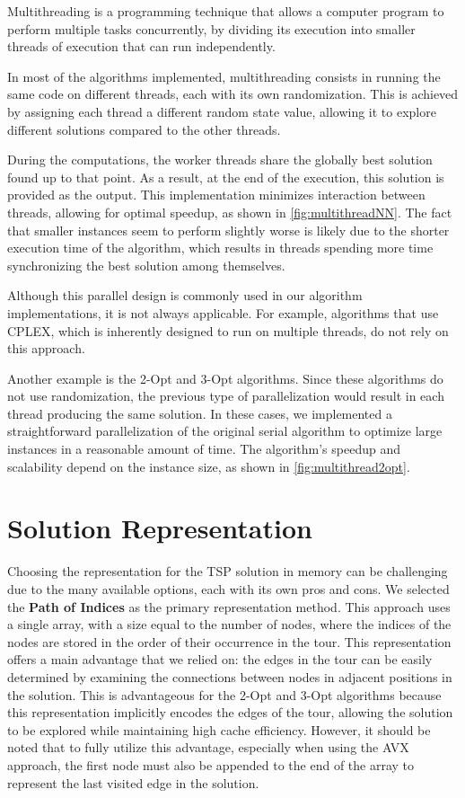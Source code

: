Multithreading is a programming technique that allows a computer program to perform multiple tasks concurrently, by dividing its execution into smaller threads of execution that can run independently.

In most of the algorithms implemented, multithreading consists in running the same code on different threads, each with its own randomization.
This is achieved by assigning each thread a different random state value, allowing it to explore different solutions compared to the other threads.

During the computations, the worker threads share the globally best solution found up to that point.
As a result, at the end of the execution, this solution is provided as the output.
This implementation minimizes interaction between threads, allowing for optimal speedup, as shown in \figurename{ \ref{fig:multithreadNN}}.
The fact that smaller instances seem to perform slightly worse is likely due to the shorter execution time of the algorithm, which results in threads spending more time synchronizing the best solution among themselves.

Although this parallel design is commonly used in our algorithm implementations, it is not always applicable.
For example, algorithms that use CPLEX, which is inherently designed to run on multiple threads, do not rely on this approach.

Another example is the 2-Opt and 3-Opt algorithms.
Since these algorithms do not use randomization, the previous type of parallelization would result in each thread producing the same solution.
In these cases, we implemented a straightforward parallelization of the original serial algorithm to optimize large instances in a reasonable amount of time.
The algorithm's speedup and scalability depend on the instance size, as shown in \figurename{ \ref{fig:multithread2opt}}.

\section{Solution Representation}

Choosing the representation for the TSP solution in memory can be challenging due to the many available options, each with its own pros and cons.
We selected the \textbf{Path of Indices} as the primary representation method.
This approach uses a single array, with a size equal to the number of nodes, where the indices of the nodes are stored in the order of their occurrence in the tour.
This representation offers a main advantage that we relied on: the edges in the tour can be easily determined by examining the connections between nodes in adjacent positions in the solution.
This is advantageous for the 2-Opt and 3-Opt algorithms because this representation implicitly encodes the edges of the tour, allowing the solution to be explored while maintaining high cache efficiency.
However, it should be noted that to fully utilize this advantage, especially when using the AVX approach, the first node must also be appended to the end of the array to represent the last visited edge in the solution.

